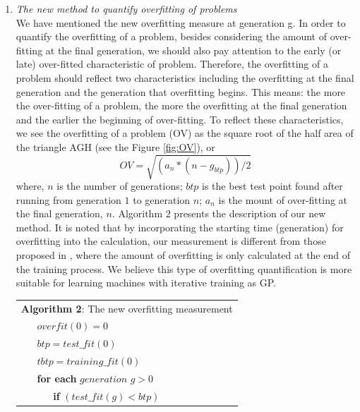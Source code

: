 \begin{enumerate}
\begin{enumerate}
\item \textit{The new method to quantify overfitting of problems} \\
We have mentioned the new overfitting measure at generation g. In order to quantify the overfitting of a problem, besides considering the amount of over-fitting  at the final generation, we should also pay attention to the early (or late) over-fitted characteristic of problem. Therefore, the overfitting of a problem should reflect two characteristics including the overfitting at the final generation and the generation that overfitting begins. This means: the more the over-fitting of a problem, the more the overfitting at the final generation and the earlier the beginning of over-fitting. To reflect these characteristics, we see the overfitting of a problem (OV) as the square root of the half area of the triangle AGH (see the Figure \ref{fig:OV}), or 
\begin{equation}
OV=\sqrt{(a_{n}*(n-{g}_{btp}))/2} 
\end{equation}
where, $n$ is the number of generations; $btp$ is the best test point found after running from generation $1$ to generation $n$;  $a_{n}$ is the mount of over-fitting at the final generation, $n$. Algorithm 2 presents the description of our new method. It is noted that by incorporating the starting time (generation) for overfitting into the calculation, our measurement is different from those proposed in \cite{2008Trevor}\cite{Marcel}\cite{copas1983regression}\cite{bilger2015measuring}, where the amount of overfitting is only calculated at the end of the training process. We believe this type of overfitting quantification is more suitable for learning machines with iterative training as GP.
\begin{table}
\begin{tabular}{lllllllllll}
\multicolumn{11}{l}{\textbf{Algorithm 2}: The new overfitting measurement} \\
\multicolumn{1}{l|}{} & \multicolumn{10}{l}{$overfit(0) = 0$} \\
\multicolumn{1}{l|}{} & \multicolumn{10}{l}{$btp = test\_fit(0)$} \\
\multicolumn{1}{l|}{} & \multicolumn{10}{l}{$tbtp = training\_fit(0)$} \\
\multicolumn{1}{l|}{} & \multicolumn{10}{l}{\textbf{for each } $generation$ $g>0$ } \\
\multicolumn{1}{l|}{} & \multicolumn{1}{l|}{} & \multicolumn{9}{l}{  \textbf{if} $(test\_fit(g) < btp)$} \\

\end{tabular}
\end{table}
\end{enumerate}
\end{enumerate}
